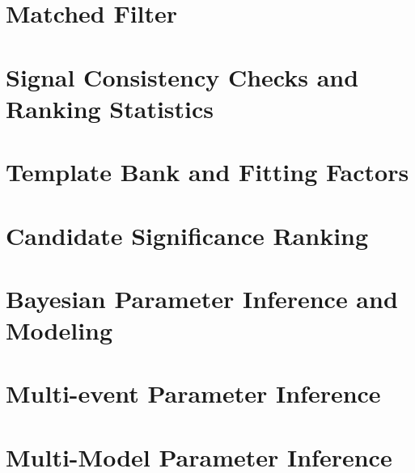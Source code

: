 \section{Matched Filter}

\section{Signal Consistency Checks and Ranking Statistics}

\section{Template Bank and Fitting Factors}

\section{Candidate Significance Ranking}

\section{Bayesian Parameter Inference and Modeling}

\section{Multi-event Parameter Inference}

\section{Multi-Model Parameter Inference}
